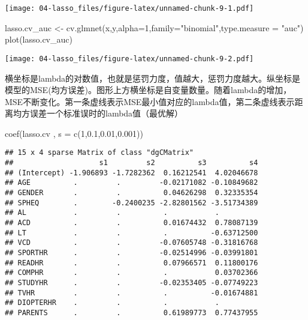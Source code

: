 \documentclass[]{ctexbook}
\newenvironment{Shaded}{\begin{snugshade}}{\end{snugshade}}
\newcommand{\AttributeTok}[1]{\textcolor[rgb]{0.77,0.63,0.00}{#1}}
\newcommand{\DecValTok}[1]{\textcolor[rgb]{0.00,0.00,0.81}{#1}}
\newcommand{\FloatTok}[1]{\textcolor[rgb]{0.00,0.00,0.81}{#1}}
\newcommand{\FunctionTok}[1]{\textcolor[rgb]{0.00,0.00,0.00}{#1}}
\newcommand{\NormalTok}[1]{#1}
\newcommand{\OtherTok}[1]{\textcolor[rgb]{0.56,0.35,0.01}{#1}}
\newcommand{\StringTok}[1]{\textcolor[rgb]{0.31,0.60,0.02}{#1}}
\begin{document}
\texttt{[image: 04-lasso\_files/figure-latex/unnamed-chunk-9-1.pdf]}

\begin{Shaded}
\begin{Highlighting}[]
\NormalTok{lasso.cv\_auc }\OtherTok{\textless{}{-}} \FunctionTok{cv.glmnet}\NormalTok{(x,y,}\AttributeTok{alpha=}\DecValTok{1}\NormalTok{,}\AttributeTok{family=}\StringTok{"binomial"}\NormalTok{,}\AttributeTok{type.measure =} \StringTok{"auc"}\NormalTok{)}
\FunctionTok{plot}\NormalTok{(lasso.cv\_auc)}
\end{Highlighting}
\end{Shaded}

\texttt{[image: 04-lasso\_files/figure-latex/unnamed-chunk-9-2.pdf]}

横坐标是lambda的对数值，也就是惩罚力度，值越大，惩罚力度越大。纵坐标是模型的MSE(均方误差)。图形上方横坐标是自变量数量。随着lambda的增加，MSE不断变化。第一条虚线表示MSE最小值对应的lambda值，第二条虚线表示距离均方误差一个标准误时的lambda值（最优解）

\begin{Shaded}
\begin{Highlighting}[]
\FunctionTok{coef}\NormalTok{(lasso.cv , }\AttributeTok{s =} \FunctionTok{c}\NormalTok{(}\DecValTok{1}\NormalTok{,}\FloatTok{0.1}\NormalTok{,}\FloatTok{0.01}\NormalTok{,}\FloatTok{0.001}\NormalTok{))}
\end{Highlighting}
\end{Shaded}

\begin{verbatim}
## 15 x 4 sparse Matrix of class "dgCMatrix"
##                    s1         s2          s3          s4
## (Intercept) -1.906893 -1.7282362  0.16212541  4.02046678
## AGE          .         .         -0.02171082 -0.10849682
## GENDER       .         .          0.04626298  0.32335354
## SPHEQ        .        -0.2400235 -2.82801562 -3.51734389
## AL           .         .          .           .         
## ACD          .         .          0.01674432  0.78087139
## LT           .         .          .          -0.63712500
## VCD          .         .         -0.07605748 -0.31816768
## SPORTHR      .         .         -0.02514996 -0.03991801
## READHR       .         .          0.07966571  0.11800176
## COMPHR       .         .          .           0.03702366
## STUDYHR      .         .         -0.02353405 -0.07749223
## TVHR         .         .          .          -0.01674881
## DIOPTERHR    .         .          .           .         
## PARENTS      .         .          0.61989773  0.77437955
\end{verbatim}
\end{document}

